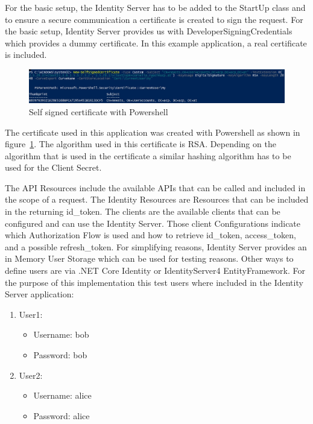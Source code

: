 For the basic setup, the Identity Server has to be added to the StartUp class and to ensure a secure communication a certificate is created to sign the request. For the basic setup, Identity Server provides us with DeveloperSigningCredentials which provides a dummy certificate. In this example application, a real certificate is included. 

\begin{figure}[h]
	\centering
	\includegraphics[width=0.9\linewidth]{images/self-signed-certicate}
	\caption{Self signed certificate with Powershell}
	\label{fig:self-signed-certicate}
\end{figure}

The certificate used in this application was created with Powershell as shown in figure~\ref{fig:self-signed-certicate}. The algorithm used in this certificate is RSA. Depending on the algorithm that is used in the certificate a similar hashing algorithm has to be used for the Client Secret.


The API Resources include the available APIs that can be called and included in the scope of a request. The Identity Resources are Resources that can be included in the returning id\_token. The clients are the available clients that can be configured and can use the Identity Server. Those client Configurations indicate which Authorization Flow is used and how to retrieve id\_token, access\_token, and a possible refresh\_token. For simplifying reasons, Identity Server provides an in Memory User Storage which can be used for testing reasons. Other ways to define users are via .NET Core Identity or IdentityServer4 EntityFramework. For the purpose of this implementation this test users where included in the Identity Server application:
\begin{enumerate}
	\item User1:
	\begin{itemize}
		\item  Username: bob
		\item  Password: bob
	\end{itemize} 
	\item User2:
	\begin{itemize}
		\item  Username: alice
		\item  Password: alice
	\end{itemize} 
\end{enumerate}

